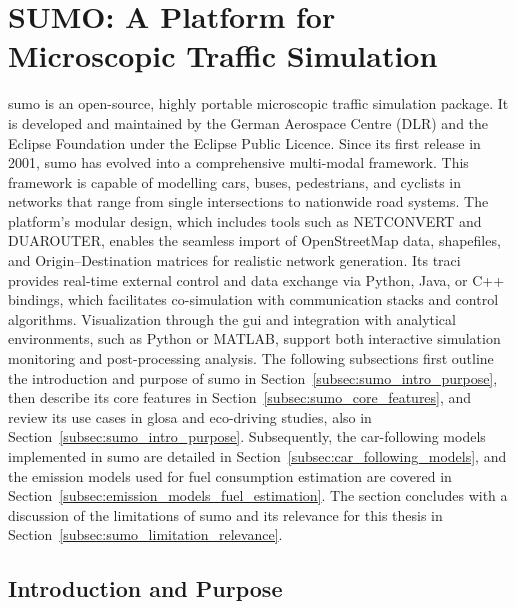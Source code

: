 \section{SUMO: A Platform for Microscopic Traffic Simulation}
\label{sec:SUMO}
\ac{sumo} is an open-source, highly portable microscopic traffic simulation package. It is developed and maintained by the German Aerospace Centre (DLR) and the Eclipse Foundation under the Eclipse Public Licence. \cite{SUMOWebsite2025, EclipseNews2017} Since its first release in 2001, \ac{sumo} has evolved into a comprehensive multi-modal framework. This framework is capable of modelling cars, buses, pedestrians, and cyclists in networks that range from single intersections to nationwide road systems. \cite{SUMODocs2025, Krajzewicz2002} The platform’s modular design, which includes tools such as NETCONVERT and DUAROUTER, enables the seamless import of OpenStreetMap data, shapefiles, and Origin–Destination matrices for realistic network generation. \cite{SUMODocs2025} Its \ac{traci} provides real-time external control and data exchange via Python, Java, or C++ bindings, which facilitates co-simulation with communication stacks and control algorithms. Visualization through the \ac{gui} and integration with analytical environments, such as Python or MATLAB, support both interactive simulation monitoring and post-processing analysis. \cite{TraCIDocs2024}
\mynewline
The following subsections first outline the introduction and purpose of \ac{sumo} in Section~\vref{subsec:sumo_intro_purpose}, then describe its core features in Section~\vref{subsec:sumo_core_features}, and review its use cases in \ac{glosa} and eco-driving studies, also in Section~\vref{subsec:sumo_intro_purpose}. Subsequently, the car-following models implemented in \ac{sumo} are detailed in Section~\vref{subsec:car_following_models}, and the emission models used for fuel consumption estimation are covered in Section~\vref{subsec:emission_models_fuel_estimation}. The section concludes with a discussion of the limitations of \ac{sumo} and its relevance for this thesis in Section~\vref{subsec:sumo_limitation_relevance}.


\subsection{Introduction and Purpose}
\label{subsec:sumo_intro_purpose}

